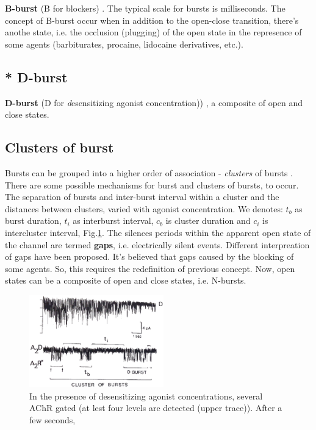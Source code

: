 {\bf B-burst} (B for blockers) \citep{colquhoun1981fmt}.
The typical scale for bursts is milliseconds. The concept of B-burst occur when
in addition to the open-close transition, there's anothe state, i.e. the
occlusion (plugging) of the open state in the represence of some agents
(barbiturates, procaine, lidocaine derivatives, etc.).

\subsection{* D-burst}

{\bf D-burst} (D for {\it d}esensitizing agonist concentration))
\citep{sakmann1980}, a composite of open and close states.


\subsection{Clusters of burst}
\label{sec:burst_cluster}

Bursts can be grouped into a higher order of association - {\it clusters} of
bursts \citep{colquhoun1981sps}.
There are some possible mechanisms for burst and clusters of bursts, to occur.
The separation of bursts and inter-burst interval within a cluster and the
distances between clusters, varied with agonist concentration. We denotes: $t_b$
as burst duration, $t_i$ as interburst interval, $c_b$ is cluster duration and
$c_i$ is intercluster interval, Fig.\ref{fig:Burst_opening}. The silences
periods within the apparent open state of the channel are termed {\bf gaps},
i.e. electrically silent events. Different interpreation of gaps have been
proposed. It's believed that gaps caused by the blocking of some agents. So,
this requires the redefinition of previous concept. Now, open states can be a
composite of open and close states, i.e. N-bursts.

\begin{figure}[hbt]
  \centerline{\includegraphics[height=4cm,
    angle=0]{./images/Burst_opening.eps}}
\caption{In the presence of desensitizing agonist concentrations, several AChR
gated (at lest four levels are detected (upper trace)). After a few seconds, }
\label{fig:Burst_opening}
\end{figure}



